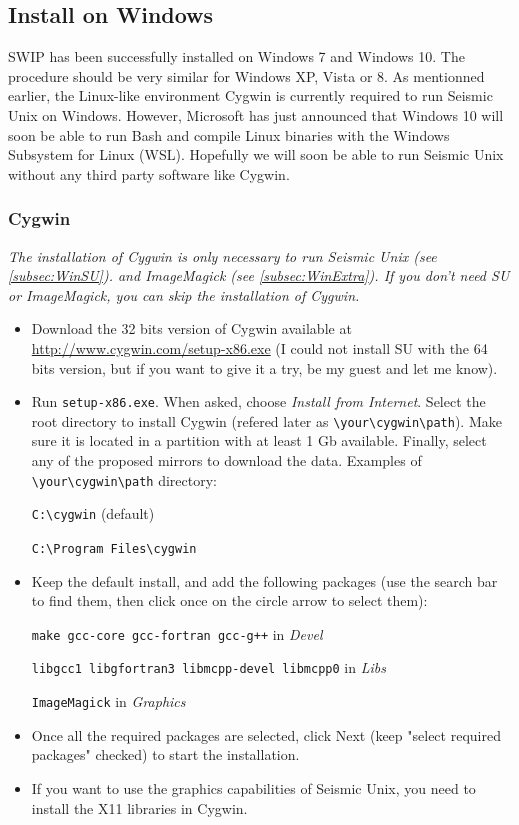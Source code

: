 \documentclass[twoside,a4paper]{article}
\begin{document}
\subsection{Install on Windows}
SWIP has been successfully installed on Windows 7 and Windows 10. The procedure should be very similar for Windows XP, Vista or 8. As mentionned earlier, the Linux-like environment Cygwin is currently required to run Seismic Unix on Windows. However, Microsoft has just announced that Windows 10 will soon be able to run Bash and compile Linux binaries with the Windows Subsystem for Linux (WSL). Hopefully we will soon be able to run Seismic Unix without any third party software like Cygwin.

\subsubsection{Cygwin}
\textit{The installation of Cygwin is only necessary to run Seismic Unix (see \ref{subsec:WinSU}). and ImageMagick (see \ref{subsec:WinExtra}). If you don't need SU or ImageMagick, you can skip the installation of Cygwin.}
\begin{itemize}
\setlength\itemsep{2ex}
\setlength{\parindent}{5ex}
\item Download the 32 bits version of Cygwin available at \url{http://www.cygwin.com/setup-x86.exe} (I could not install SU with the 64 bits version, but if you want to give it a try, be my guest and let me know).

\item Run \verb|setup-x86.exe|. When asked, choose \textit{Install from Internet}. Select the root directory to install Cygwin (refered later as \verb|\your\cygwin\path|). Make sure it is located in a partition with at least 1 Gb available. Finally, select any of the proposed mirrors to download the data.
Examples of \verb|\your\cygwin\path| directory:

\verb|C:\cygwin| (default)

\verb|C:\Program Files\cygwin|

\item Keep the default install, and add the following packages (use the search bar to find them, then click once on the circle arrow to select them):

\verb|make gcc-core gcc-fortran gcc-g++| in \textit{Devel}

\verb|libgcc1 libgfortran3 libmcpp-devel libmcpp0| in \textit{Libs}

\verb|ImageMagick| in \textit{Graphics}

\item Once all the required packages are selected, click Next (keep "select required packages" checked) to start the installation.

\item If you want to use the graphics capabilities of Seismic Unix, you need to install the X11 libraries in Cygwin.
\end{itemize}
\end{document}
